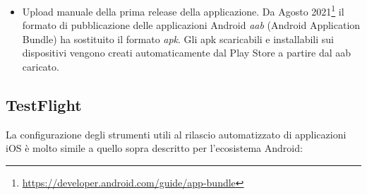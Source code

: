 \begin{itemize}
\begin{itemize}
        \begin{listing}[H]
        \inputminted{bash}{code/4-jks}
        \caption{Creazione, codifica e decodifica della chiave JKS}
        \end{listing}
    \end{itemize}
    \item Upload manuale della prima release della applicazione. Da Agosto 2021\footnote{\url{https://developer.android.com/guide/app-bundle}} il formato di pubblicazione delle applicazioni Android \textit{aab} (Android Application Bundle) ha sostituito il formato \textit{apk}. Gli apk scaricabili e installabili sui dispositivi vengono creati automaticamente dal Play Store a partire dal aab caricato.
\end{itemize}

\subsection{TestFlight}
La configurazione degli strumenti utili al rilascio automatizzato di applicazioni iOS è molto simile a quello sopra descritto per l'ecosistema Android: 
